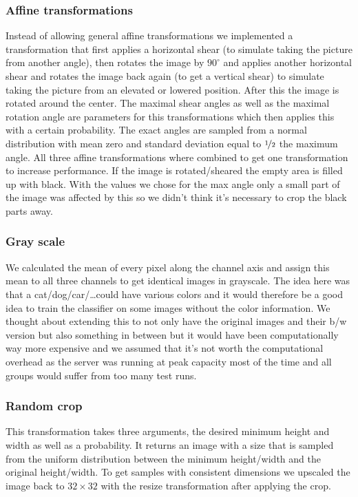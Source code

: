 \subsubsection{Affine transformations} Instead of allowing general affine transformations we implemented a transformation that first applies a horizontal shear (to simulate taking the picture from another angle), then rotates the image by $90^\circ$ and applies another horizontal shear and rotates the image back again (to get a vertical shear) to simulate taking the picture from an elevated or lowered position. After this the image is rotated around the center. The maximal shear angles as well as the maximal rotation angle are parameters for this transformations which then applies this with a certain probability. The exact angles are sampled from a normal distribution with mean zero and standard deviation equal to $\nicefrac 1 2$ the maximum angle. All three affine transformations where combined to get one transformation to increase performance. If the image is rotated/sheared the empty area is filled up with black. With the values we chose for the max angle only a small part of the image was affected by this so we didn't think it's necessary to crop the black parts away.
\subsubsection{Gray scale} We calculated the mean of every pixel along the channel axis and assign this mean to all three channels to get identical images in grayscale. The idea here was that a cat/dog/car/\ldots could have various colors and it would therefore be a good idea to train the classifier on some images without the color information. We thought about extending this to not only have the original images and their b/w version but also something in between but it would have been computationally way more expensive and we assumed that it's not worth the computational overhead as the server was running at peak capacity most of the time and all groups would suffer from too many test runs.
\subsubsection{Random crop} This transformation takes three arguments, the desired minimum height and width as well as a probability. It returns an image with a size that is sampled from the uniform distribution between the minimum height/width and the original height/width. To get samples with consistent dimensions we upscaled the image back to $32\times 32$ with the resize transformation after applying the crop. 


